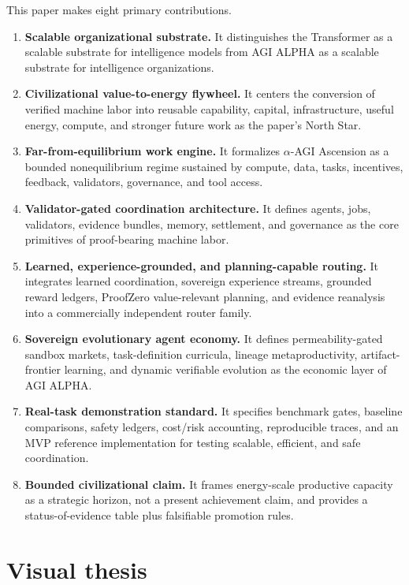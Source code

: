 \documentclass[11pt]{article}
\providecommand{\tightlist}{\setlength{\itemsep}{0pt}\setlength{\parskip}{0pt}}
\begin{document}
This paper makes eight primary contributions.

\begin{enumerate}
\def\labelenumi{\arabic{enumi}.}
\tightlist
\item
  \textbf{Scalable organizational substrate.} It distinguishes the Transformer as a scalable substrate for intelligence models from AGI ALPHA as a scalable substrate for intelligence organizations.
\item
  \textbf{Civilizational value-to-energy flywheel.} It centers the conversion of verified machine labor into reusable capability, capital, infrastructure, useful energy, compute, and stronger future work as the paper's North Star.
\item
  \textbf{Far-from-equilibrium work engine.} It formalizes $\alpha$-AGI Ascension as a bounded nonequilibrium regime sustained by compute, data, tasks, incentives, feedback, validators, governance, and tool access.
\item
  \textbf{Validator-gated coordination architecture.} It defines agents, jobs, validators, evidence bundles, memory, settlement, and governance as the core primitives of proof-bearing machine labor.
\item
  \textbf{Learned, experience-grounded, and planning-capable routing.} It integrates learned coordination, sovereign experience streams, grounded reward ledgers, ProofZero value-relevant planning, and evidence reanalysis into a commercially independent router family.
\item
  \textbf{Sovereign evolutionary agent economy.} It defines permeability-gated sandbox markets, task-definition curricula, lineage metaproductivity, artifact-frontier learning, and dynamic verifiable evolution as the economic layer of AGI ALPHA.
\item
  \textbf{Real-task demonstration standard.} It specifies benchmark gates, baseline comparisons, safety ledgers, cost/risk accounting, reproducible traces, and an MVP reference implementation for testing scalable, efficient, and safe coordination.
\item
  \textbf{Bounded civilizational claim.} It frames energy-scale productive capacity as a strategic horizon, not a present achievement claim, and provides a status-of-evidence table plus falsifiable promotion rules.
\end{enumerate}

\section{Visual thesis}\label{visual-thesis}
\end{document}
